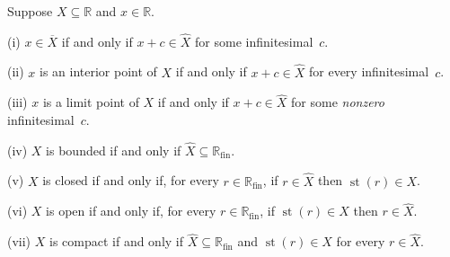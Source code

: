 \documentclass{article}
\def\R{\mathbb R}
\def\Rfin{\mathbb R_{\operatorname{fin}}}
\def\st{\operatorname{st}}
\begin{document}
\begin{proposition}\label{topsubset}
Suppose $X\subseteq\R$ and $x\in\R$.

(i) $x\in\overline X$ if and only if $x+c\in\widehat X$ for some infinitesimal~$c$.

(ii) $x$ is an interior point of $X$ if and only if $x+c\in\widehat X$ for every infinitesimal~$c$.

(iii) $x$ is a limit point of $X$ if and only if $x+c\in\widehat X$ for some \emph{nonzero} infinitesimal~$c$.

(iv) $X$ is bounded if and only if $\widehat X\subseteq\Rfin$.

(v) $X$ is closed if and only if, for every $r\in\Rfin$, if $r\in\widehat X$ then $\st(r)\in X$.

(vi) $X$ is open if and only if, for every $r\in\Rfin$, if $\st(r)\in X$ then $r\in\widehat X$.

(vii) $X$ is compact if and only if $\widehat X\subseteq\Rfin$ and $\st(r)\in X$ for every $r\in\widehat X$.
\end{proposition}
\end{document}
